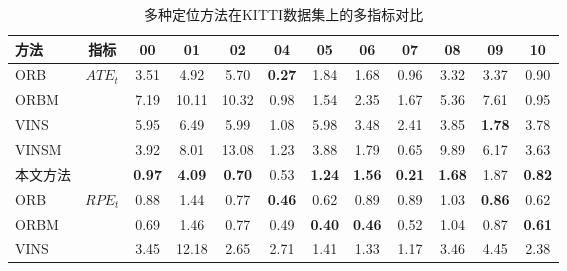 \begin{table}
\centering
\begin{threeparttable}
\caption{多种定位方法在KITTI数据集上的多指标对比}
\begin{tabular}{lccccccccccc}
\toprule
方法    & 指标                    & 00            & 01            & 02            & 04            & 05            & 06            & 07            & 08            & 09            & 10            \\ \midrule
ORB   & \multirow{5}{*}{$ATE_t$\textdownarrow{}}  & 3.51          & 4.92          & 5.70          & \cellcolor[HTML]{FFCCC9}\textbf{0.27} & 1.84          & 1.68          & 0.96          & 3.32          & 3.37          & 0.90          \\
ORBM  &                       & 7.19          & 10.11         & 10.32         & 0.98          & 1.54          & 2.35          & 1.67          & 5.36          & 7.61          & 0.95          \\
VINS  &                       & 5.95          & 6.49          & 5.99          & 1.08          & 5.98          & 3.48          & 2.41          & 3.85          & \cellcolor[HTML]{FFCCC9}\textbf{1.78}          & 3.78          \\
VINSM &                       & 3.92          & 8.01          & 13.08         & 1.23          & 3.88          & 1.79          & 0.65          & 9.89          & 6.17          & 3.63          \\
本文方法    &                       & \cellcolor[HTML]{FFCCC9}\textbf{0.97} & \cellcolor[HTML]{FFCCC9}\textbf{4.09} & \cellcolor[HTML]{FFCCC9}\textbf{0.70} & 0.53          & \cellcolor[HTML]{FFCCC9}\textbf{1.24} & \cellcolor[HTML]{FFCCC9}\textbf{1.56} & \cellcolor[HTML]{FFCCC9}\textbf{0.21} & \cellcolor[HTML]{FFCCC9}\textbf{1.68} & 1.87 & \cellcolor[HTML]{FFCCC9}\textbf{0.82} \\ \midrule
ORB   & \multirow{5}{*}{$RPE_t$\textdownarrow{}} & 0.88          & 1.44          & 0.77          & \cellcolor[HTML]{FFCCC9}\textbf{0.46} & 0.62          & 0.89          & 0.89          & 1.03          & \cellcolor[HTML]{FFCCC9}\textbf{0.86} & 0.62          \\
ORBM  &                       & 0.69          & 1.46          & 0.77          & 0.49          & \cellcolor[HTML]{FFCCC9}\textbf{0.40} & \cellcolor[HTML]{FFCCC9}\textbf{0.46} & 0.52          & 1.04          & 0.87          & \cellcolor[HTML]{FFCCC9}\textbf{0.61} \\
VINS  &                       & 3.45          & 12.18         & 2.65          & 2.71          & 1.41          & 1.33          & 1.17          & 3.46          & 4.45          & 2.38          \\

\end{tabular}
\end{threeparttable}
\end{table}
